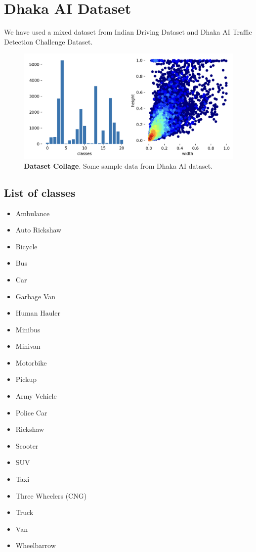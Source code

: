 \section{Dhaka AI Dataset}
We have used  a mixed dataset from Indian Driving Dataset and Dhaka AI Traffic Detection Challenge Dataset. 
\begin{figure}[H] %
  \centering
  \includegraphics[width=\textwidth]{figures/paper/dhaka-ai+idd.png}
  \caption[Dataset Collage]{\textbf{Dataset Collage}. Some sample data from Dhaka AI dataset.}
  \label{fig:figures/paper/dhaka-ai+idd.png}
\end{figure}


\subsection{List of classes}
\begin{multicols}{2}
\begin{itemize}
\item Ambulance
\item Auto Rickshaw
\item Bicycle
\item Bus
\item Car
\item Garbage Van
\item Human Hauler
\item Minibus
\item Minivan
\item Motorbike
\item Pickup
\item Army Vehicle
\item Police Car
\item Rickshaw
\item Scooter
\item SUV
\item Taxi
\item Three Wheelers (CNG)
\item Truck
\item Van
\item Wheelbarrow
\end{itemize}
\end{multicols}


